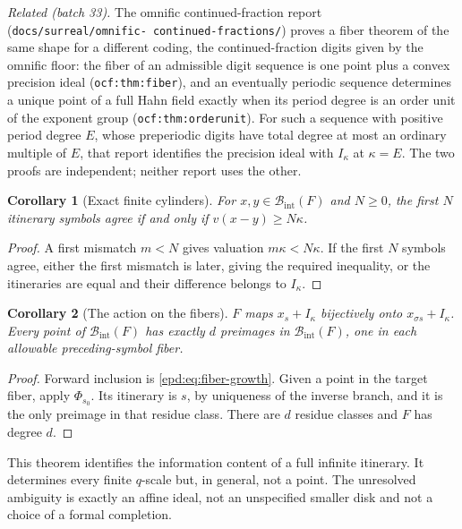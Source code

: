\documentclass[11pt,a4paper]{article}
\numberwithin{equation}{section}
\theoremstyle{plain}
\newtheorem{corollary}[corollary]{Corollary}
\theoremstyle{definition}
\theoremstyle{remark}
\newcommand{\Ik}{I_\kappa}
\newcommand{\BI}{\mathcal B_{\mathrm{int}}}
\newcommand{\sh}{\sigma}
\begin{document}
\emph{Related (batch 33).} The omnific continued-fraction report
(\texttt{docs/\allowbreak surreal/\allowbreak omnific-\allowbreak
continued-\allowbreak fractions/}) proves a fiber theorem of the same shape
for a different coding, the continued-fraction digits given by the omnific
floor: the fiber of an admissible digit sequence is one point plus a convex
precision ideal (\texttt{ocf:thm:fiber}), and an eventually periodic sequence
determines a unique point of a full Hahn field exactly when its period degree
is an order unit of the exponent group (\texttt{ocf:thm:orderunit}). For such
a sequence with positive period degree $E$, whose preperiodic digits have
total degree at most an ordinary multiple of $E$, that report identifies the precision ideal with
$\Ik$ at $\kappa=E$. The two proofs are independent; neither report uses the
other.

\begin{corollary}[Exact finite cylinders]\label{epd:cor:cylinders}
For $x,y\in\BI(F)$ and $N\geq0$, the first $N$ itinerary symbols agree
if and only if $v(x-y)\geq N\kappa$.
\end{corollary}
\begin{proof}
A first mismatch $m<N$ gives valuation $m\kappa<N\kappa$. If the first
$N$ symbols agree, either the first mismatch is later, giving the
required inequality, or the itineraries are equal and their difference
belongs to $\Ik$.
\end{proof}

\begin{corollary}[The action on the fibers]\label{epd:cor:fiber-bijection}
$F$ maps $x_s+\Ik$ bijectively onto $x_{\sh s}+\Ik$. Every point of
$\BI(F)$ has exactly $d$ preimages in $\BI(F)$, one in each allowable
preceding-symbol fiber.
\end{corollary}
\begin{proof}
Forward inclusion is \eqref{epd:eq:fiber-growth}. Given a point in the
target fiber, apply $\Phi_{s_0}$. Its itinerary is $s$, by uniqueness
of the inverse branch, and it is the only preimage in that residue
class. There are $d$ residue classes and $F$ has degree $d$.
\end{proof}

This theorem identifies the information content of a full infinite
itinerary. It determines every finite $q$-scale but, in general, not a
point. The unresolved ambiguity is exactly an affine ideal, not an
unspecified smaller disk and not a choice of a formal completion.
\end{document}

